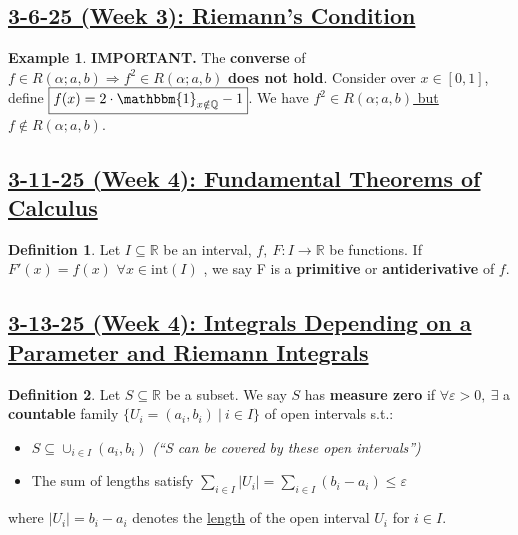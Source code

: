 \documentclass[12pt,a4paper]{article}
\theoremstyle{definition}
\newtheorem{defin}{Definition}[subsection]
\newtheorem{ex}{Example}[subsection]
\newenvironment{definition}{
  \begin{defin}
}{
  \end{defin}
  \vspace{0.125em}
}
\newenvironment{example}{
  \begin{ex}
}{%
  \end{ex}
  \vspace{0.125em}
}
\begin{document}
\setcounter{defin}{0}
\setcounter{ex}{0}
\subsection*{\underline{\textbf{3-6-25 (Week 3): Riemann's Condition}}}
\begin{example}
  \textbf{IMPORTANT.} The \textbf{converse} of $f \in R(\alpha; a, b) \Rightarrow f^2 \in R(\alpha; a, b)$ \textbf{does not hold}. Consider over $x \in [0, 1]$, define $\boxed{f(x) = 2 \cdot \mathbbm{1}_{x \notin \mathbb{Q}} - 1}$. We have \underline{$f^2 \in R(\alpha; a, b)$ but $f \notin R(\alpha; a, b)$}.
\end{example}

\setcounter{defin}{0}
\setcounter{ex}{0}
\subsection*{\underline{\textbf{3-11-25 (Week 4): Fundamental Theorems of Calculus}}}
\begin{definition}
  Let $I \subseteq \mathbb{R}$ be an interval, $f,\ F: I \to \mathbb{R}$ be functions. If \underline{$F'(x) = f(x)$} $\forall x \in \text{int}(I)$ , we say F is a \textbf{primitive} or \textbf{antiderivative} of $f$.
\end{definition}

\setcounter{defin}{0}
\setcounter{ex}{0}
\subsection*{\underline{\textbf{3-13-25 (Week 4): Integrals Depending on a Parameter and Riemann Integrals}}}
\begin{definition}
  Let $S \subseteq \mathbb{R}$ be a subset. We say $S$ has \textbf{measure zero} if $\forall \varepsilon > 0,\ \exists$ a \textbf{countable} family $\{U_i = (a_i, b_i)\ |\ i \in I\}$ of open intervals s.t.:
  \begin{itemize}
    \item \underline{$S \subseteq \cup_{i \in I} (a_i, b_i)$} \textit{(``S can be covered by these open intervals'')}
    \item The sum of lengths satisfy \underline{$\sum_{i \in I} |U_i| = \sum_{i \in I}(b_i - a_i) \leq \varepsilon$}
  \end{itemize}
  where \underline{$|U_i| = b_i - a_i$} denotes the \underline{length} of the open interval $U_i$ for $i \in I$.
\end{definition}
\end{document}
